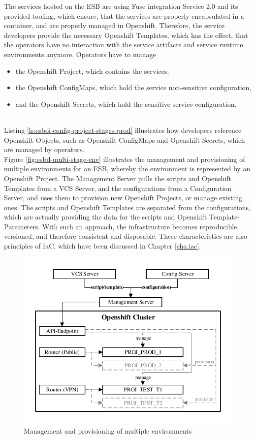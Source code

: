 The services hosted on the ESB are using Fuse integration Service 2.0 and its provided tooling, which ensure, that the services are properly encapsulated in a container, and are properly managed in Openshift. Therefore, the service developers provide the necessary Openshift Templates, which has the effect, that the operators have no interaction with the service artifacts and service runtime environments anymore. Operators have to manage
\begin{itemize}
	\item the Openshift Project, which contains the services,
	\item the Openshift ConfigMaps, which hold the service non-sensitive configuration,
	\item and the Openshift Secrets, which hold the sensitive service configuration.
\end{itemize} 
\ \\
Listing \vref{ls:esboi-config-project-stages-prod} illustrates how developers reference Openshift Objects, such as Openshift ConfigMaps and Openshift Secrets, which are managed by operators. \\ 

Figure \vref{fig:esbd-multi-stage-env} illustrates the management and provisioning of multiple environments for an ESB, whereby the environment is represented by an Openshift Project. The Management Server pulls the scripts and Openshift Templates from a VCS Server, and the configurations from a Configuration Server, and uses them to provision new Openshift Projects, or manage existing ones. The scripts and Openshift Templates are separated from the configurations, which are actually providing the data for the scripts and Openshift Template-Parameters. With such an approach, the infrastructure becomes reproducible, versioned, and therefore consistent and disposable. These characteristics are also principles of IaC, which have been discussed in Chapter \vref{cha:iac}.
\newpage 

\begin{figure}[htbp]
	\centering
	\includegraphics[scale=1]{images/esbd-multi-stage-env.pdf}
	\caption{Management and provisioning of multiple environments}
	\label{fig:esbd-multi-stage-env}
\end{figure}

